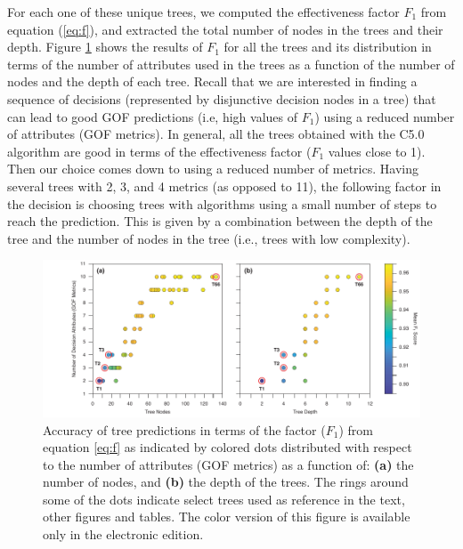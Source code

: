 For each one of these unique trees, we computed the effectiveness factor $F_1$ from equation (\ref{eq:f}), and extracted the total number of nodes in the trees and their depth. Figure \ref{fig:nodes-depth} shows the results of $F_1$ for all the trees and its distribution in terms of the number of  attributes  used in the trees as a function of the number of nodes and the depth of each tree. Recall that we are interested in finding a sequence of decisions (represented by disjunctive decision nodes in a tree) that can lead to good GOF predictions (i.e, high values of $F_1$) using a reduced number of attributes (GOF metrics). In general, all the trees obtained with the C5.0 algorithm are good in terms of the effectiveness factor ($F_1$ values close to 1). Then our choice comes down to using a reduced number of metrics. Having several trees with 2, 3, and 4 metrics (as opposed to 11), the following factor in the decision is choosing trees with algorithms using a small number of steps to reach the prediction. This is given by a combination between the depth of the tree and the number of nodes in the tree (i.e., trees with low complexity).

\begin{figure}[t]
	\centering
	\includegraphics[width=\textwidth]{figures/pdf/figure-08}
	\caption{Accuracy of tree predictions in terms of the factor ($F_1$) from equation \ref{eq:f} as indicated by colored dots distributed with respect to the number of attributes (GOF metrics) as a function of: \textbf{(a)} the number of nodes, and \textbf{(b)} the depth of the trees. The rings around some of the dots indicate select trees used as reference in the text, other figures and tables. The color version of this figure is available only in the electronic edition.}
	\label{fig:nodes-depth}
\end{figure}

